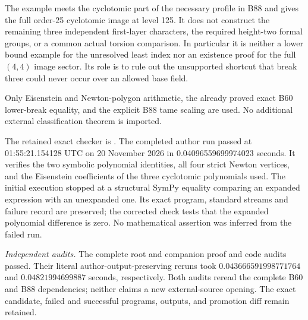 \begin{remark}
\label{rem:B-RD89-scope}
The example meets the cyclotomic part of the necessary
profile in B88 and gives the full order-25 cyclotomic
image at level 125. It does not construct the remaining
three independent first-layer characters, the required
height-two formal groups, or a common actual torsion
comparison. In particular it is neither a lower bound
example for the unresolved least index nor an existence
proof for the full \((4,4)\) image sector. Its role is
to rule out the unsupported shortcut that break three
could never occur over an allowed base field.

Only Eisenstein and Newton-polygon arithmetic, the
already proved exact B60 lower-break equality, and
the explicit B88 tame scaling are used. No additional
external classification theorem is imported.

The retained exact checker is
.
The completed author run passed at 01:55:21.154128 UTC
on 20 November 2026 in 0.04096559699974023 seconds.
It verifies the two symbolic polynomial identities,
all four strict Newton vertices, and the Eisenstein
coefficients of the three cyclotomic polynomials used.
The initial execution stopped at a structural SymPy
equality comparing an expanded expression with an
unexpanded one. Its exact program, standard streams
and failure record are preserved; the corrected check
tests that the expanded polynomial difference is zero.
No mathematical assertion was inferred from the failed run.

\smallskip
\noindent\emph{Independent audits.}
The complete root and companion proof and code audits passed.
Their literal author-output-preserving reruns took
\(0.043666591998771764\) and
\(0.04821994699887\) seconds, respectively.
Both audits reread the complete B60 and B88 dependencies;
neither claims a new external-source opening. The exact
candidate, failed and successful programs, outputs, and
promotion diff remain retained.
\end{remark}
